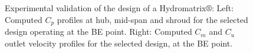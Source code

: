 

\begin{figure}[h!]
\begin{minipage}[b]{0.5\linewidth}
 \centering
\end{minipage}
\begin{minipage}[b]{0.5\linewidth}
 \centering
\end{minipage}

\caption{Experimental validation of the design of a Hydromatrix$\circledR$: Left: Computed $C_p$ profiles at hub, mid-span and shroud for the selected design operating at the BE point. Right: Computed $C_m$ and $C_u$ outlet velocity profiles for the selected design, at the BE point.}
\label{exp.BE}
\end{figure}
 
